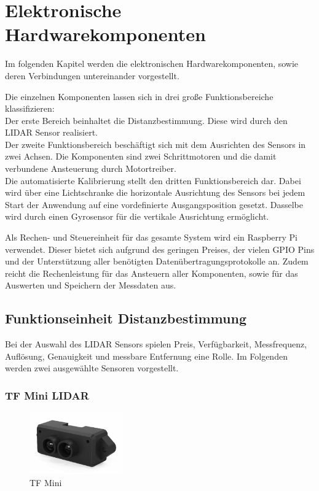 
\chapter{Elektronische Hardwarekomponenten}\label{chap:hardware}

Im folgenden Kapitel werden die elektronischen Hardwarekomponenten, sowie deren Verbindungen untereinander vorgestellt. 

Die einzelnen Komponenten lassen sich in drei große Funktionsbereiche klassifizieren:\\
Der erste Bereich beinhaltet die Distanzbestimmung. Diese wird durch den \ac{LIDAR} Sensor realisiert.\\
Der zweite Funktionsbereich beschäftigt sich mit dem Ausrichten des Sensors in zwei Achsen. Die Komponenten sind zwei Schrittmotoren und die damit verbundene Ansteuerung durch Motortreiber. \\
Die automatisierte Kalibrierung stellt den dritten Funktionsbereich dar. Dabei wird über eine Lichtschranke die horizontale Ausrichtung des Sensors bei jedem Start der Anwendung auf eine vordefinierte Ausgangsposition gesetzt. Dasselbe wird durch einen Gyrosensor für die vertikale Ausrichtung ermöglicht.

Als Rechen- und Steuereinheit für das gesamte System wird ein Raspberry Pi verwendet. Dieser bietet sich aufgrund des geringen Preises, der vielen \ac{GPIO} Pins und der Unterstützung aller benötigten Datenübertragungsprotokolle an. Zudem reicht die Rechenleistung für das Ansteuern aller Komponenten, sowie für das Auswerten und Speichern der Messdaten aus.\\

\section{Funktionseinheit Distanzbestimmung}

Bei der Auswahl des \ac{LIDAR} Sensors spielen Preis, Verfügbarkeit, Messfrequenz, Auflösung, Genauigkeit und messbare Entfernung eine Rolle. Im Folgenden werden zwei ausgewählte Sensoren vorgestellt. 


\subsection{TF Mini \ac{LIDAR}}\label{tf_mini}


\begin{figure}
	\vspace{-22pt}
	\hspace{5mm}
	\includegraphics[width=4cm]{images/Hardware/TFmini.png}
	\caption{TF Mini}
	\vspace{-10pt}
	
\end{figure}

